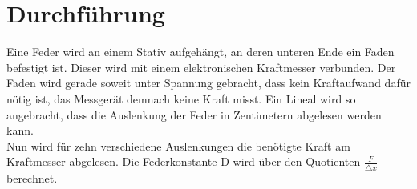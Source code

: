 \section{Durchführung}
\label{sec:Durchführung}
Eine Feder wird an einem Stativ aufgehängt, an deren unteren Ende ein Faden befestigt ist.
Dieser wird mit einem elektronischen Kraftmesser verbunden. 
Der Faden wird gerade soweit unter Spannung gebracht, dass kein Kraftaufwand dafür nötig ist, 
das Messgerät demnach keine Kraft misst.
Ein Lineal wird so angebracht, dass die Auslenkung der Feder in Zentimetern abgelesen werden kann. \\
Nun wird für zehn verschiedene Auslenkungen die benötigte Kraft am Kraftmesser abgelesen. 
Die Federkonstante D wird über den Quotienten $\frac{F}{\triangle x}$ berechnet. 